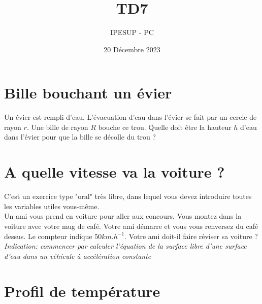 \documentclass{article}
\title{TD7}
\author{IPESUP - PC }
\date{20 Décembre 2023}
\begin{document}
\maketitle



\section{Bille bouchant un évier}

Un évier est rempli d'eau. L'évacuation d'eau dans l'évier se fait par un cercle de rayon $r$. Une bille de rayon $R$ bouche ce trou. Quelle doit être la hauteur $h$ d'eau dans l'évier pour que la bille se décolle du trou ? 

\section{A quelle vitesse va la voiture ? }

C'est un exercice type "oral" très libre, dans lequel vous devez introduire toutes les variables utiles vous-même. \\[0.1cm]

Un ami vous prend en voiture pour aller aux concours. Vous montez dans la voiture avec votre mug de café. Votre ami démarre et vous vous renversez du café dessus. Le compteur indique $50 km.h^{-1}$. Votre ami doit-il faire réviser sa voiture ? \\[0.1cm]


\textit{Indication: commencer par calculer l'équation de la surface libre d'une surface d'eau dans un véhicule à accélération constante}


\section{Profil de température}
\end{document}
